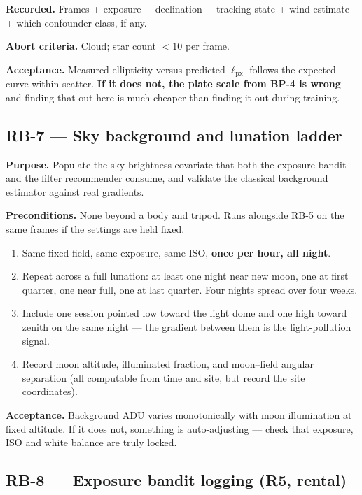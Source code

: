 \documentclass[11pt]{article}
\begin{document}
\textbf{Recorded.} Frames + exposure + declination + tracking state + wind
estimate + which confounder class, if any.

\textbf{Abort criteria.} Cloud; star count $<10$ per frame.

\textbf{Acceptance.} Measured ellipticity versus predicted
$\ell_{\mathrm{px}}$ follows the expected curve within scatter. \textbf{If it
does not, the plate scale from BP-4 is wrong} --- and finding that out here is
much cheaper than finding it out during training.

\subsection*{RB-7 --- Sky background and lunation ladder}

\textbf{Purpose.} Populate the sky-brightness covariate that both the exposure
bandit and the filter recommender consume, and validate the classical
background estimator against real gradients.

\textbf{Preconditions.} None beyond a body and tripod. Runs alongside RB-5 on
the same frames if the settings are held fixed.

\begin{enumerate}
\item Same fixed field, same exposure, same ISO, \textbf{once per hour, all
      night}.
\item Repeat across a full lunation: at least one night near new moon, one at
      first quarter, one near full, one at last quarter. Four nights spread over
      four weeks.
\item Include one session pointed low toward the light dome and one high toward
      zenith on the same night --- the gradient between them is the
      light-pollution signal.
\item Record moon altitude, illuminated fraction, and moon--field angular
      separation (all computable from time and site, but record the site
      coordinates).
\end{enumerate}

\textbf{Acceptance.} Background ADU varies monotonically with moon illumination
at fixed altitude. If it does not, something is auto-adjusting --- check that
exposure, ISO and white balance are truly locked.

\subsection*{RB-8 --- Exposure bandit logging (R5, rental)}
\end{document}
